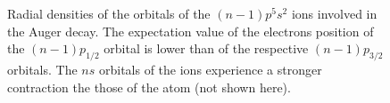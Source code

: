 \begin{figure}[h]
 \caption{Radial densities of the orbitals of the $(n-1)p^5s^2$ ions
          involved in the Auger decay.
          The expectation value of the electrons position of the $(n-1)p_{1/2}$
          orbital is lower than of the respective $(n-1)p_{3/2}$
          orbitals. The $ns$ orbitals of the ions experience a stronger
          contraction the those of the atom (not shown here).}
 \label{fig:radial}
\end{figure}
